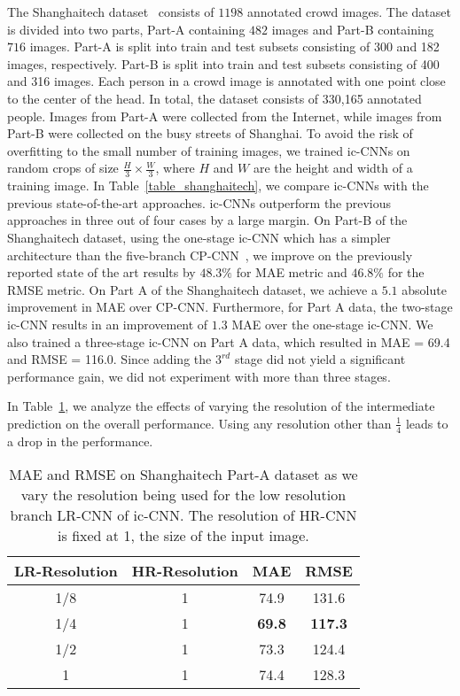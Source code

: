 \documentclass[runningheads]{llncs}
\begin{document}
The Shanghaitech dataset~\cite{zhang2016single} consists of
$1198$ annotated crowd images. The dataset is divided into two parts, Part-A containing $482$ images and Part-B containing $716$ images. Part-A is split into train and test subsets consisting of 300 and 182 images,  respectively. Part-B is split into train and test subsets consisting of 400 and 316 images. Each person in a crowd image is annotated with one point close to the center of the head. In total, the dataset consists of 330,165 annotated people. Images from Part-A were collected from the Internet, while images from Part-B were collected on the busy streets of Shanghai. To avoid the risk of overfitting to the small number of training images, we trained ic-CNNs on random crops of size $\frac{H}{3}\times\frac{W}{3}$, where $H$ and $W$ are the height and width of a training image. In Table~\ref{table_shanghaitech}, we compare ic-CNNs with the previous state-of-the-art approaches. ic-CNNs outperform the previous approaches in three out of four cases by a large margin. On Part-B of the Shanghaitech dataset, using the one-stage ic-CNN which has a simpler architecture than the five-branch CP-CNN~\cite{sindagi2017generating}, we improve on the previously reported state of the art results by $48.3\%$ for MAE metric and $46.8\%$ for the RMSE metric. On Part A of the Shanghaitech dataset, we achieve a $5.1$ absolute improvement in MAE over CP-CNN. Furthermore, for Part A data, the two-stage ic-CNN results in an improvement of $1.3$ MAE over the one-stage ic-CNN. We also trained a three-stage ic-CNN on Part A data,  which resulted in MAE = 69.4 and RMSE = 116.0. Since adding the $3^{rd}$ stage did not yield a significant performance gain, we did not experiment with more than three stages.


In Table~\ref{tab:Rebuttal-resolution}, we analyze the effects of varying the resolution of the intermediate prediction on the overall performance. Using any resolution other than $\frac{1}{4}$ leads to a drop in the performance.


\begin{table}[!t]
\centering
   \caption{MAE and RMSE on Shanghaitech Part-A dataset as we vary the resolution being used for the low resolution branch LR-CNN of ic-CNN. The resolution of HR-CNN is fixed at 1, the size of the input image.\label{tab:Rebuttal-resolution} }
\begin{tabular}{cccc}
\toprule
LR-Resolution & HR-Resolution & MAE & RMSE \\
\midrule
1/8   &  1  &  74.9   &    131.6 \\ 
1/4  & 1   &  \textbf{69.8}   &   \textbf{117.3}  \\  
1/2  & 1   &  73.3  &  124.4  \\ 
1   &  1  &   74.4  &  128.3   \\    \bottomrule
   \end{tabular}
\end{table}
\end{document}
